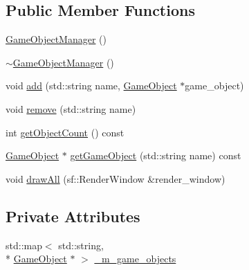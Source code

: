 \subsection*{Public Member Functions}
\begin{DoxyCompactItemize}
\item 
\hyperlink{class_game_object_manager_a58cbaec4182cda7c6d48eef7b14885e8}{Game\+Object\+Manager} ()
\item 
\hyperlink{class_game_object_manager_a91d57baff47ce5090e5e4590f531051d}{$\sim$\+Game\+Object\+Manager} ()
\item 
void \hyperlink{class_game_object_manager_abd5bf89a1a767486dbcb0ef1a600d0b2}{add} (std\+::string name, \hyperlink{class_game_object}{Game\+Object} $\ast$game\+\_\+object)
\item 
void \hyperlink{class_game_object_manager_a0469ca3148149a6cfa0214a0f4f4b102}{remove} (std\+::string name)
\item 
int \hyperlink{class_game_object_manager_aea3ab827dd015aae7a8e8d53fdd6d2b5}{get\+Object\+Count} () const 
\item 
\hyperlink{class_game_object}{Game\+Object} $\ast$ \hyperlink{class_game_object_manager_a9711a8874ef5581db4832fc28dc0e87c}{get\+Game\+Object} (std\+::string name) const 
\item 
void \hyperlink{class_game_object_manager_a7ab22ae52c51eba926aa461028c00fb3}{draw\+All} (sf\+::\+Render\+Window \&render\+\_\+window)
\end{DoxyCompactItemize}
\subsection*{Private Attributes}
\begin{DoxyCompactItemize}
\item 
std\+::map$<$ std\+::string, \\*
\hyperlink{class_game_object}{Game\+Object} $\ast$ $>$ \hyperlink{class_game_object_manager_a8e5f1dadc41529ca112ff4aa23d92048}{\+\_\+m\+\_\+game\+\_\+objects}
\end{DoxyCompactItemize}


